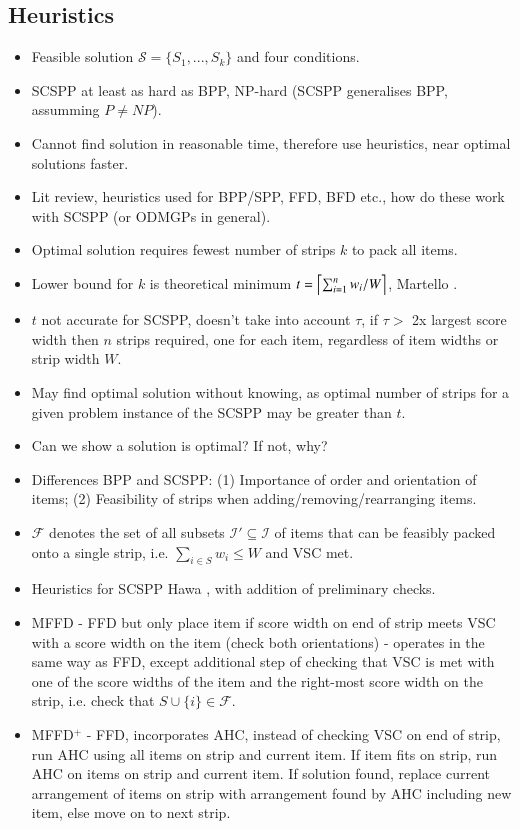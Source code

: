 \documentclass{elsarticle}
\begin{document}
\subsection{Heuristics}
\label{sub:heuristics}

\begin{itemize}
	\item Feasible solution $\mathcal{S} = \{S_1,...,S_k\}$ and four conditions.
	\item SCSPP at least as hard as BPP, NP-hard (SCSPP generalises BPP, assumming $P \neq NP$).
	\item Cannot find solution in reasonable time, therefore use heuristics, near optimal solutions faster.
	\item Lit review, heuristics used for BPP/SPP, FFD, BFD etc., how do these work with SCSPP (or ODMGPs in general).
	\item Optimal solution requires fewest number of strips $k$ to pack all items.
	\item Lower bound for $k$ is theoretical minimum $t = \ceil*{\sum_{i=1}^{n}w_i / W}$, Martello \cite{martello1990l}.
	\item $t$ not accurate for SCSPP, doesn't take into account $\tau$, if $\tau >$ 2x largest score width then $n$ strips required, one for each item, regardless of item widths or strip width $W$.
	\item May find optimal solution without knowing, as optimal number of strips for a given problem instance of the SCSPP may be greater than $t$.
	\item Can we show a solution is optimal? If not, why?
	\item Differences BPP and SCSPP: (1) Importance of order and orientation of items; (2) Feasibility of strips when adding/removing/rearranging items.
	\item $\mathcal{F}$ denotes the set of all subsets $\mathcal{I}' \subseteq \mathcal{I}$ of items that can be feasibly packed onto a single strip, i.e. $\sum_{i \in S} w_i \leq W$ and VSC met.
	\item Heuristics for SCSPP Hawa \cite{hawa2018}, with addition of preliminary checks.
	\item MFFD - FFD but only place item if score width on end of strip meets VSC with a score width on the item (check both orientations) - operates in the same way as FFD, except additional step of checking that VSC is met with one of the score widths of the item and the right-most score width on the strip, i.e. check that $S \cup \{i\} \in \mathcal{F}$.
	\item MFFD$^+$ - FFD, incorporates AHC, instead of checking VSC on end of strip, run AHC using all items on strip and current item. If item fits on strip, run AHC on items on strip and current item. If solution found, replace current arrangement of items on strip with arrangement found by AHC including new item, else move on to next strip.

\end{itemize}
\end{document}
